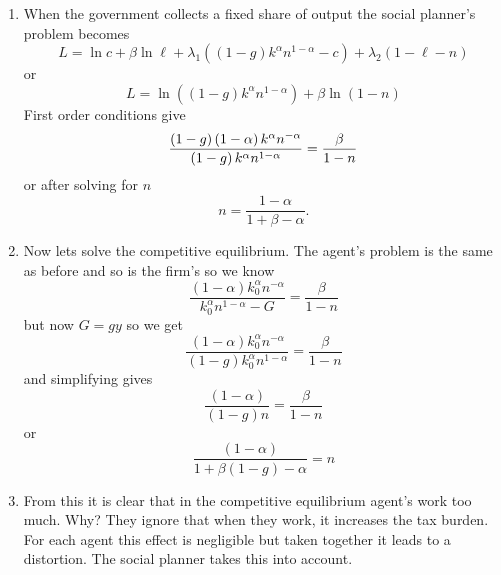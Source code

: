 \documentclass{article}
\begin{document}
\begin{enumerate}
\begin{enumerate}
\item When the government collects a fixed share of output the social
planner's problem becomes%
\begin{equation*}
L=\ln c+\beta \ln \ell +\lambda _{1}\left( \left( 1-g\right) k^{\alpha
}n^{1-\alpha }-c\right) +\lambda _{2}\left( 1-\ell -n\right)
\end{equation*}%
or%
\begin{equation*}
L=\ln (\left( 1-g\right) k^{\alpha }n^{1-\alpha })+\beta \ln \left(
1-n\right)
\end{equation*}%
First order conditions give 
\begin{equation*}
\frac{\left( 1-g\right) \left( 1-\alpha \right) k^{\alpha }n^{-\alpha }}{%
\left( 1-g\right) k^{\alpha }n^{1-\alpha }}=\frac{\beta }{1-n}
\end{equation*}%
or after solving for $n$ 
\begin{equation*}
n=\frac{1-\alpha }{1+\beta -\alpha }.
\end{equation*}

\item Now lets solve the competitive equilibrium. The agent's problem is the
same as before and so is the firm's so we know%
\begin{equation*}
\frac{\left( 1-\alpha \right) k_{0}^{\alpha }n^{-\alpha }}{k_{0}^{\alpha
}n^{1-\alpha }-G}=\frac{\beta }{1-n}
\end{equation*}%
but now $G=gy$ so we get 
\begin{equation*}
\frac{\left( 1-\alpha \right) k_{0}^{\alpha }n^{-\alpha }}{\left( 1-g\right)
k_{0}^{\alpha }n^{1-\alpha }}=\frac{\beta }{1-n}
\end{equation*}%
and simplifying gives 
\begin{equation*}
\frac{\left( 1-\alpha \right) }{\left( 1-g\right) n}=\frac{\beta }{1-n}
\end{equation*}%
or 
\begin{equation*}
\frac{\left( 1-\alpha \right) }{1+\beta \left( 1-g\right) -\alpha }=n
\end{equation*}

\item From this it is clear that in the competitive equilibrium agent's work
too much. Why? They ignore that when they work, it increases the tax burden.
For each agent this effect is negligible but taken together it leads to a
distortion. The social planner takes this into account.


\end{enumerate}
\end{enumerate}
\end{document}
